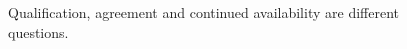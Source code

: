 \begin{figure}[H]
\centering
{}
\caption{Qualification, agreement and continued availability are different questions.}\label{fig:gap-spi-consent}
\end{figure}

